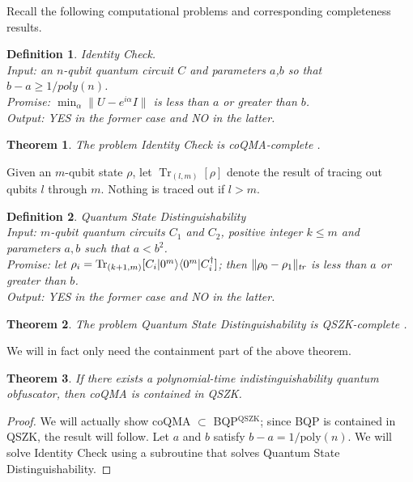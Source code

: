 \documentclass[11pt]{article}
\DeclareMathOperator{\tr}{Tr}
\numberwithin{equation}{section}
\newtheorem{theorem}{Theorem}
\newtheorem{definition}{Definition}
\begin{document}
{Recall the following computational problems and corresponding completeness results.

\begin{definition} \emph{Identity Check.}\\
\indent Input: an $n$-qubit quantum circuit $C$ and parameters $a$,$b$ so that $b-a\geq 1/poly(n)$. \\
\indent Promise: $\min_\alpha \| U - e^{i \alpha} I \|$ is less than $a$ or greater than $b$.\\
\indent Output: YES in the former case and NO in the latter.
\end{definition}
\begin{theorem} 
The problem Identity Check is coQMA-complete \cite{JWB03}. 
\end{theorem}

Given an $m$-qubit state $\rho$, let $\tr_{(l, m)}[\rho]$ denote the result of tracing out qubits $l$ through $m$. Nothing is traced out if $l > m$.

\begin{definition} \emph{Quantum State Distinguishability}\\
\indent Input: $m$-qubit quantum circuits $C_1$ and $C_2$, positive integer $k \leq m$ and parameters $a,b$ such that $a<b^2$.\\
\indent Promise: let $\rho_i = \tr_{(k+1, m)}[C_i\ket{0^m}\bra{0^m}C_i^\dagger]$; then $\|\rho_0 - \rho_1\|_\emph{tr}$ is less than $a$ or greater than $b$.\\
\indent Output: YES in the former case and NO in the latter.
\end{definition}

\begin{theorem}
The problem Quantum State Distinguishability is QSZK-complete \cite{Watrous02}.
\end{theorem}

We will in fact only need the containment part of the above theorem.

\begin{theorem}
If there exists a polynomial-time indistinguishability quantum obfuscator, then coQMA is contained in QSZK.
\end{theorem}
\begin{proof}
We will actually show coQMA $\subset$ BQP$^{\text{QSZK}}$; since BQP is contained in QSZK, the result will follow. Let $a$ and $b$ satisfy $b-a = 1 / \text{poly}(n)$. We will solve Identity Check using a subroutine that solves Quantum State Distinguishability. 


\end{proof}}
\end{document}
